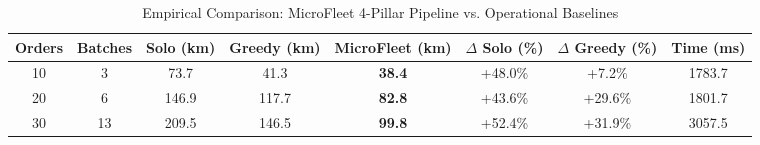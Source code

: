 \begin{table}[htbp]
\centering
\caption{Empirical Comparison: MicroFleet 4-Pillar Pipeline vs. Operational Baselines}
\label{tab:microfleet_benchmarks}
\begin{tabular}{cccccccc}
\hline
\textbf{Orders} & \textbf{Batches} & \textbf{Solo (km)} & \textbf{Greedy (km)} & \textbf{MicroFleet (km)} & \textbf{$\Delta$ Solo (\%)} & \textbf{$\Delta$ Greedy (\%)} & \textbf{Time (ms)} \\
\hline
10 & 3 & 73.7 & 41.3 & \textbf{38.4} & +48.0\% & +7.2\% & 1783.7 \\
20 & 6 & 146.9 & 117.7 & \textbf{82.8} & +43.6\% & +29.6\% & 1801.7 \\
30 & 13 & 209.5 & 146.5 & \textbf{99.8} & +52.4\% & +31.9\% & 3057.5 \\
\hline
\end{tabular}
\end{table}